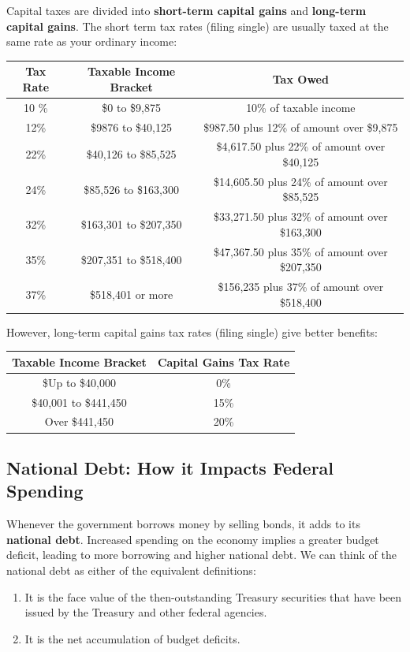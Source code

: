 \documentclass{article}
\begin{document}
    \begin{example}
      Capital taxes are divided into \textbf{short-term capital gains} and \textbf{long-term capital gains}. The short term tax rates (filing single) are usually taxed at the same rate as your ordinary income:
      \begin{center}
      \begin{tabular}{c|c|c}
          Tax Rate & Taxable Income Bracket & Tax Owed \\
          \hline
          10 \% & \$0 to \$9,875 & 10\% of taxable income \\
          12\% & \$9876 to \$40,125 & \$987.50 plus 12\% of amount over \$9,875\\
          22\% & \$40,126 to \$85,525 & \$4,617.50 plus 22\% of amount over \$40,125\\
          24\% & \$85,526 to \$163,300 & \$14,605.50 plus 24\% of amount over \$85,525\\
          32\% & \$163,301 to \$207,350 & \$33,271.50 plus 32\% of amount over \$163,300\\
          35\% & \$207,351 to \$518,400 & \$47,367.50 plus 35\% of amount over \$207,350\\
          37\% & \$518,401 or more & \$156,235 plus 37\% of amount over \$518,400
      \end{tabular}
      \end{center}
      However, long-term capital gains tax rates (filing single) give better benefits: 
      \begin{center}
      \begin{tabular}{c|c}
          Taxable Income Bracket & Capital Gains Tax Rate\\
          \hline
          \$Up to \$40,000 & 0\% \\
          \$40,001 to \$441,450 & 15\% \\
          Over \$441,450 & 20\% 
      \end{tabular}
      \end{center}
    \end{example}

  \subsection{National Debt: How it Impacts Federal Spending}

    Whenever the government borrows money by selling bonds, it adds to its \textbf{national debt}. Increased spending on the economy implies a greater budget deficit, leading to more borrowing and higher national debt. We can think of the national debt as either of the equivalent definitions:
    \begin{enumerate}
      \item It is the face value of the then-outstanding Treasury securities that have been issued by the Treasury and other federal agencies.
      \item It is the net accumulation of budget deficits.
    \end{enumerate}
\end{document}
